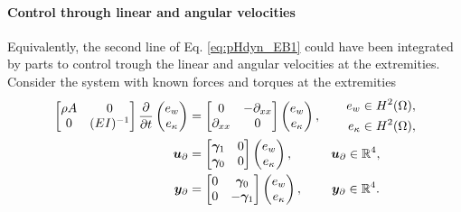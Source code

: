 \paragraph{Control through linear and angular velocities}
Equivalently, the second line of Eq. \eqref{eq:pHdyn_EB1} could have been integrated by parts to control trough the linear and angular velocities at the extremities. Consider the system with known forces and torques at the extremities
\begin{subequations}\label{eq:pHlinsys_EB2}
	\begin{align}
	\begin{bmatrix}
	\rho A & 0 \\
	0 &(EI)^{-1} \\
	\end{bmatrix}
	\diffp{}{t}\begin{pmatrix}
	e_w \\ e_\kappa \\
	\end{pmatrix} &= \begin{bmatrix}
	0 & -\partial_{xx} \\
	\partial_{xx} & 0 \\
	\end{bmatrix} \begin{pmatrix}
	e_w \\ e_\kappa \\
	\end{pmatrix}, \qquad \begin{aligned}
	e_w \in H^2(\Omega), \\
	e_\kappa \in H^2(\Omega), \\
	\end{aligned} \label{eq:pHdyn_EB2}\\
	\bm{u}_\partial &= \begin{bmatrix}
	\bm\gamma_{1} & 0\\
	\bm\gamma_{0} & 0 
	\end{bmatrix}
	\begin{pmatrix}
	e_w \\ e_\kappa \\
	\end{pmatrix}, \qquad \quad   \bm{u}_\partial \in \mathbb{R}^4,  \\
	\bm{y}_\partial &= \begin{bmatrix}
	0 &\bm\gamma_{0} \\
	0 &-\bm\gamma_{1} 
	\end{bmatrix} \begin{pmatrix}
	e_w \\ e_\kappa \\
	\end{pmatrix}, \qquad \; \bm{y}_\partial \in \mathbb{R}^4.
	\end{align}
\end{subequations}
